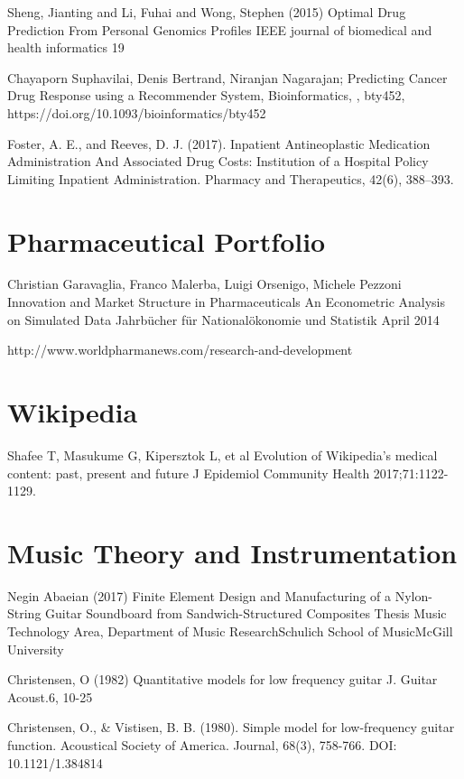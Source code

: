 \begin{thebibliography}{00}
Sheng, Jianting and Li, Fuhai and Wong, Stephen (2015)
\newblock Optimal Drug Prediction From Personal Genomics Profiles
\newblock IEEE journal of biomedical and health informatics 19

 Chayaporn Suphavilai, Denis Bertrand, Niranjan Nagarajan; 
\newblock Predicting Cancer Drug Response using a Recommender System, 
\newblock Bioinformatics, , bty452, https://doi.org/10.1093/bioinformatics/bty452

Foster, A. E., and Reeves, D. J. (2017). 
\newblock Inpatient Antineoplastic Medication Administration And Associated Drug Costs: Institution of a Hospital Policy Limiting Inpatient Administration. 
\newblock Pharmacy and Therapeutics, 42(6), 388–393.

\section{Pharmaceutical Portfolio}

 Christian Garavaglia, Franco Malerba, Luigi Orsenigo, Michele Pezzoni
\newblock Innovation and Market Structure in Pharmaceuticals An Econometric Analysis on Simulated Data
\newblock Jahrbücher für Nationalökonomie und Statistik April 2014

 http://www.worldpharmanews.com/research-and-development

\section{Wikipedia}

 Shafee T, Masukume G, Kipersztok L, et al
\newblock Evolution of Wikipedia’s medical content: past, present and future
\newblock J Epidemiol Community Health 2017;71:1122-1129.

\section{Music Theory and Instrumentation}

 Negin Abaeian (2017)
\newblock Finite Element Design and Manufacturing of a Nylon-String Guitar Soundboard from Sandwich-Structured Composites
\newblock Thesis Music Technology Area, Department of Music ResearchSchulich School of MusicMcGill University

 Christensen, O (1982)
\newblock Quantitative models for low frequency guitar
\newblock J. Guitar Acoust.6, 10-25 

 Christensen, O., & Vistisen, B. B. (1980). 
\newblock Simple model for low-frequency guitar function. 
\newblock Acoustical Society of America. Journal, 68(3), 758-766. DOI: 10.1121/1.384814


\end{thebibliography}

